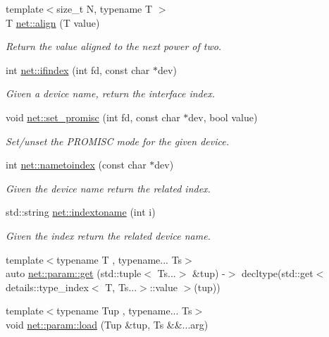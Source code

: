 \begin{DoxyCompactItemize}
\item 
{\footnotesize template$<$size\-\_\-t N, typename T $>$ }\\T \hyperlink{namespacenet_ac59f25900e63bf19f99bbcb44824b134}{net\-::align} (T value)
\begin{DoxyCompactList}\small\item\em Return the value aligned to the next power of two. \end{DoxyCompactList}\item 
int \hyperlink{namespacenet_a01d1d9ebab237e4740263e2deba1ab1d}{net\-::ifindex} (int fd, const char $\ast$dev)
\begin{DoxyCompactList}\small\item\em Given a device name, return the interface index. \end{DoxyCompactList}\item 
void \hyperlink{namespacenet_a69de0e47b041dff359c54fe92eb8830a}{net\-::set\-\_\-promisc} (int fd, const char $\ast$dev, bool value)
\begin{DoxyCompactList}\small\item\em Set/unset the P\-R\-O\-M\-I\-S\-C mode for the given device. \end{DoxyCompactList}\item 
int \hyperlink{namespacenet_aa90cbca6e910724bc46d5f4c2b12cddf}{net\-::nametoindex} (const char $\ast$dev)
\begin{DoxyCompactList}\small\item\em Given the device name return the related index. \end{DoxyCompactList}\item 
std\-::string \hyperlink{namespacenet_ac7628d7e4c8e89d8ada4d75c292f575f}{net\-::indextoname} (int i)
\begin{DoxyCompactList}\small\item\em Given the index return the related device name. \end{DoxyCompactList}\item 
{\footnotesize template$<$typename T , typename... Ts$>$ }\\auto \hyperlink{namespacenet_1_1param_a9020a1d5f00da972acbea3e809d3c602}{net\-::param\-::get} (std\-::tuple$<$ Ts...$>$ \&tup) -\/$>$ decltype(std\-::get$<$ details\-::type\-\_\-index$<$ T, Ts...$>$\-::value $>$(tup))
\item 
{\footnotesize template$<$typename Tup , typename... Ts$>$ }\\void \hyperlink{namespacenet_1_1param_aef5f360e345f5ab876c171a76a0777a2}{net\-::param\-::load} (Tup \&tup, Ts \&\&...arg)
\end{DoxyCompactItemize}

